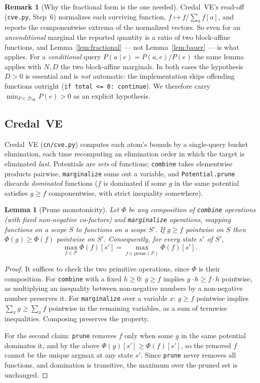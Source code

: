 \documentclass[11pt]{article}
\newtheorem{lemma}{Lemma}
\theoremstyle{definition}
\newtheorem{remark}{Remark}
\newcommand{\DSE}{\mathcal{D}_{\mathrm{SE}}}
\begin{document}
\begin{remark}[Why the fractional form is the one needed]\label{rem:whyfrac}
Credal~VE's read-off (\texttt{cve.py}, Step~6) normalizes each surviving function,
$f\mapsto f/\sum_a f[a]$, and reports the componentwise extrema of the normalized vectors. So even
for an \emph{unconditional} marginal the reported quantity is a ratio of two block-affine functions,
and Lemma~\ref{lem:fractional} --- not Lemma~\ref{lem:bauer} --- is what applies. For a
\emph{conditional} query $P(a\mid e)=P(a,e)/P(e)$ the same lemma applies with $N,D$ the two
block-affine marginals. In both cases the hypothesis $D>0$ is essential and is \emph{not} automatic:
the implementation skips offending functions outright (\texttt{if total <= 0: continue}). We
therefore carry $\min_{P\in\DSE}P(e)>0$ as an explicit hypothesis.
\end{remark}

\subsection{Credal~VE}\label{sec:cve}
Credal~VE (\texttt{cn/cve.py}) computes each atom's bounds by a single-query bucket elimination, each
time recomputing an elimination order in which the target is eliminated \emph{last}. Potentials are
\emph{sets} of functions; \texttt{combine} takes elementwise products pairwise, \texttt{marginalize}
sums out a variable, and \texttt{Potential.prune} discards \emph{dominated} functions ($f$ is
dominated if some $g$ in the same potential satisfies $g\ge f$ componentwise, with strict inequality
somewhere).

\begin{lemma}[Prune monotonicity]\label{lem:prunemono}
Let $\Phi$ be any composition of \texttt{combine} operations (with fixed non-negative co-factors) and
\texttt{marginalize} operations, mapping functions on a scope $S$ to functions on a scope $S'$. If
$g\ge f$ pointwise on $S$ then $\Phi(g)\ge\Phi(f)$ pointwise on $S'$. Consequently, for every state
$s'$ of $S'$,
\[
  \max_{f\in\mathcal P}\Phi(f)[s']=\max_{f\in\mathrm{prune}(\mathcal P)}\Phi(f)[s'].
\]
\end{lemma}

\begin{proof}
It suffices to check the two primitive operations, since $\Phi$ is their composition. For
\texttt{combine} with a fixed $h\ge0$: $g\ge f$ implies $g\cdot h\ge f\cdot h$ pointwise, as
multiplying an inequality between non-negative numbers by a non-negative number preserves it. For
\texttt{marginalize} over a variable $x$: $g\ge f$ pointwise implies
$\sum_x g\ge\sum_x f$ pointwise in the remaining variables, as a sum of termwise inequalities.
Composing preserves the property.

For the second claim: \texttt{prune} removes $f$ only when some $g$ in the same potential dominates
it, and by the above $\Phi(g)[s']\ge\Phi(f)[s']$, so the removed $f$ cannot be the unique argmax at
any state $s'$. Since \texttt{prune} never removes all functions, and domination is transitive, the
maximum over the pruned set is unchanged.
\end{proof}
\end{document}
